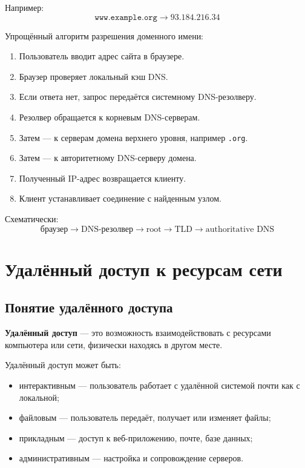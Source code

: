 \documentclass[12pt,a4paper]{article}
\begin{document}
Например:
\[
\texttt{www.example.org} \rightarrow 93.184.216.34
\]

Упрощённый алгоритм разрешения доменного имени:
\begin{enumerate}
    \item Пользователь вводит адрес сайта в браузере.
    \item Браузер проверяет локальный кэш DNS.
    \item Если ответа нет, запрос передаётся системному DNS-резолверу.
    \item Резолвер обращается к корневым DNS-серверам.
    \item Затем --- к серверам домена верхнего уровня, например \texttt{.org}.
    \item Затем --- к авторитетному DNS-серверу домена.
    \item Полученный IP-адрес возвращается клиенту.
    \item Клиент устанавливает соединение с найденным узлом.
\end{enumerate}

Схематически:
\[
\text{браузер} \rightarrow \text{DNS-резолвер} \rightarrow \text{root} \rightarrow \text{TLD} \rightarrow \text{authoritative DNS}
\]

\section{Удалённый доступ к ресурсам сети}

\subsection{Понятие удалённого доступа}

\textbf{Удалённый доступ} --- это возможность взаимодействовать с ресурсами компьютера или сети, физически находясь в другом месте.

Удалённый доступ может быть:
\begin{itemize}
    \item интерактивным --- пользователь работает с удалённой системой почти как с локальной;
    \item файловым --- пользователь передаёт, получает или изменяет файлы;
    \item прикладным --- доступ к веб-приложению, почте, базе данных;
    \item административным --- настройка и сопровождение серверов.
\end{itemize}
\end{document}

